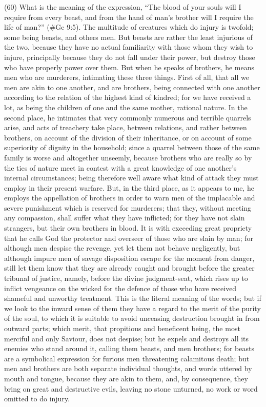 (60) What is the meaning of the expression, ``The blood of your souls will I require from every
beast, and from the hand of man's brother will I require the life of man?'' (\#Ge 9:5). The
multitude of creatures which do injury is twofold; some being beasts, and others men. But beasts
are rather the least injurious of the two, because they have no actual familiarity with those whom
they wish to injure, principally because they do not fall under their power, but destroy those who
have properly power over them. But when he speaks of brothers, he means men who are
murderers, intimating these three things. First of all, that all we men are akin to one another, and
are brothers, being connected with one another according to the relation of the highest kind of
kindred; for we have received a lot, as being the children of one and the same mother, rational
nature. In the second place, he intimates that very commonly numerous and terrible quarrels arise,
and acts of treachery take place, between relations, and rather between brothers, on account of
the division of their inheritance, or on account of some superiority of dignity in the household; since
a quarrel between those of the same family is worse and altogether unseemly, because brothers
who are really so by the ties of nature meet in contest with a great knowledge of one another's
internal circumstances; being therefore well aware what kind of attack they must employ in their
present warfare. But, in the third place, as it appears to me, he employs the appellation of brothers
in order to warn men of the implacable and severe punishment which is reserved for murderers;
that they, without meeting any compassion, shall suffer what they have inflicted; for they have not
slain strangers, but their own brothers in blood. It is with exceeding great propriety that he calls
God the protector and overseer of those who are slain by man; for although men despise the
revenge, yet let them not behave negligently, but although impure men of savage disposition
escape for the moment from danger, still let them know that they are already caught and brought
before the greater tribunal of justice, namely, before the divine judgment-seat, which rises up to
inflict vengeance on the wicked for the defence of those who have received shameful and
unworthy treatment. This is the literal meaning of the words; but if we look to the inward sense of
them they have a regard to the merit of the purity of the soul, to which it is suitable to avoid
unceasing destruction brought in from outward parts; which merit, that propitious and beneficent
being, the most merciful and only Saviour, does not despise; but he expels and destroys all its
enemies who stand around it, calling them beasts, and men brothers; for beasts are a symbolical
expression for furious men threatening calamitous death; but men and brothers are both separate
individual thoughts, and words uttered by mouth and tongue, because they are akin to them, and, by
consequence, they bring on great and destructive evils, leaving no stone unturned, no work or word
omitted to do injury.

